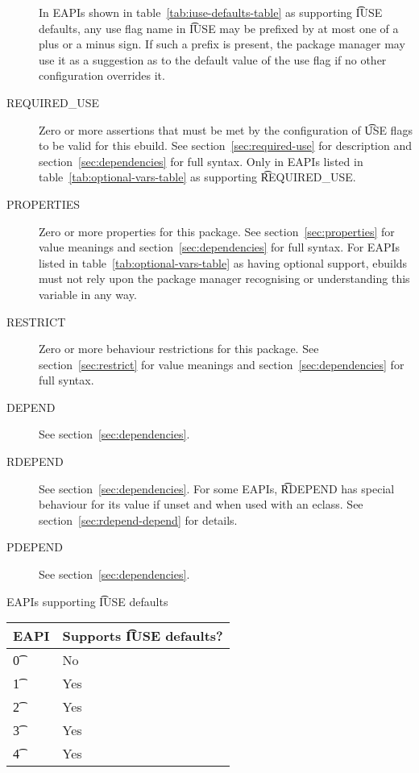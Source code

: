 \begin{description}
     In EAPIs shown in table~\ref{tab:iuse-defaults-table} as supporting
    \t{IUSE} defaults, any use flag name in \t{IUSE} may be prefixed by at most one of a plus or a
    minus sign. If such a prefix is present, the package manager may use it as a suggestion as to
    the default value of the use flag if no other configuration overrides it.
\item[REQUIRED\_USE]  Zero or more assertions that must be met by the
    configuration of \t{USE} flags to be valid for this ebuild. See section~\ref{sec:required-use}
    for description and section~\ref{sec:dependencies} for full syntax. Only in EAPIs listed in
    table~\ref{tab:optional-vars-table} as supporting \t{REQUIRED\_USE}.
\item[PROPERTIES]  Zero or more properties for this package.
    See section~\ref{sec:properties} for value meanings and section~\ref{sec:dependencies} for full
    syntax. For EAPIs listed in table~\ref{tab:optional-vars-table} as having optional support,
    ebuilds must not rely upon the package manager recognising or understanding this variable in
    any way.
\item[RESTRICT] Zero or more behaviour restrictions for this package. See section~\ref{sec:restrict}
    for value meanings and section~\ref{sec:dependencies} for full syntax.
\item[DEPEND] See section~\ref{sec:dependencies}.
\item[RDEPEND] See section~\ref{sec:dependencies}. For some EAPIs, \t{RDEPEND} has special behaviour
    for its value if unset and when used with an eclass. See section~\ref{sec:rdepend-depend} for
    details.
\item[PDEPEND] See section~\ref{sec:dependencies}.
\end{description}

\begin{centertable}{EAPIs supporting \t{IUSE} defaults} \label{tab:iuse-defaults-table}
    \begin{tabular}{ l l }
        \toprule
        \multicolumn{1}{c}{\textbf{EAPI}} &
        \multicolumn{1}{c}{\textbf{Supports \t{IUSE} defaults?}} \\
        \midrule
    \t{0} & No \\
    \t{1} & Yes \\
    \t{2} & Yes \\
    \t{3} & Yes \\
    \t{4} & Yes \\
    \bottomrule
    \end{tabular}
\end{centertable}

